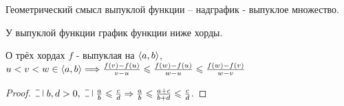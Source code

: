 \quad

\begin{remark}
    Геометрический смысл выпуклой функции -- надграфик - выпуклое множество.
\end{remark}

\begin{remark}
    У выпуклой функции график функции ниже хорды.
\end{remark}

\begin{namedlemma}{О трёх хордах} 
    $f$ - выпуклая на $\left\langle {a, b} \right\rangle$, $u < v < w \in \left\langle {a, b} \right\rangle \Longrightarrow \\ \frac{f(v) - f(u)}{v - u} \leqslant \frac{f(w) - f(u)}{w - u} \leqslant \frac{f(w) - f(v)}{w - v} $
\end{namedlemma}

\begin{proof}
    $\letus\; b, d > 0, \; \letus \; \frac{a}{b} \leqslant \frac{c}{d} \Rightarrow \frac{a}{b} \leqslant \frac{a + c}{b + d} \leqslant \frac{c}{d}$.
\end{proof}
